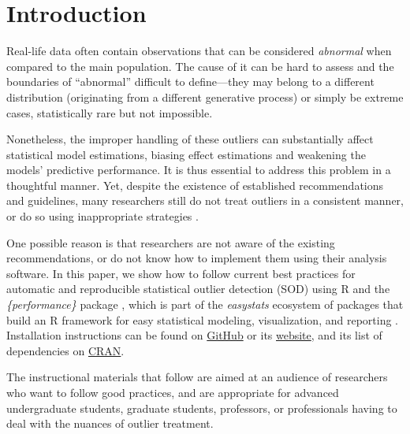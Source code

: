 \documentclass[sn-basic, lineno,pdflatex]{sn-jnl}
\begin{document}



\maketitle

\section{Introduction}\label{introduction}

Real-life data often contain observations that can be considered
\emph{abnormal} when compared to the main population. The cause of it
can be hard to assess and the boundaries of ``abnormal'' difficult to
define---they may belong to a different distribution (originating from a
different generative process) or simply be extreme cases, statistically
rare but not impossible.

Nonetheless, the improper handling of these outliers can substantially
affect statistical model estimations, biasing effect estimations and
weakening the models' predictive performance. It is thus essential to
address this problem in a thoughtful manner. Yet, despite the existence
of established recommendations and guidelines, many researchers still do
not treat outliers in a consistent manner, or do so using inappropriate
strategies \citep{simmons2011false, leys2013outliers}.

One possible reason is that researchers are not aware of the existing
recommendations, or do not know how to implement them using their
analysis software. In this paper, we show how to follow current best
practices for automatic and reproducible statistical outlier detection
(SOD) using R and the \emph{\{performance\}} package
\citep{ludecke2021performance}, which is part of the \emph{easystats}
ecosystem of packages that build an R framework for easy statistical
modeling, visualization, and reporting \citep{easystatspackage}.
Installation instructions can be found on
\href{https://github.com/easystats/performance}{GitHub} or its
\href{https://easystats.github.io/performance/}{website}, and its list
of dependencies on
\href{https://cran.r-project.org/package=performance}{CRAN}.

The instructional materials that follow are aimed at an audience of
researchers who want to follow good practices, and are appropriate for
advanced undergraduate students, graduate students, professors, or
professionals having to deal with the nuances of outlier treatment.
\end{document}
